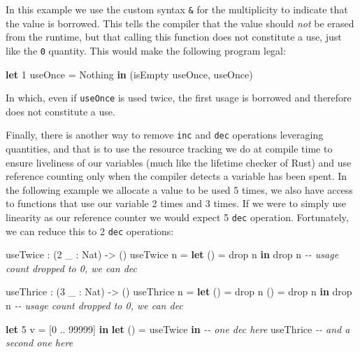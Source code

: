 \documentclass[
]{article}
\newenvironment{Shaded}{}{}
\newcommand{\CommentTok}[1]{\textcolor[rgb]{0.38,0.63,0.69}{\textit{#1}}}
\newcommand{\DataTypeTok}[1]{\textcolor[rgb]{0.56,0.13,0.00}{#1}}
\newcommand{\DecValTok}[1]{\textcolor[rgb]{0.25,0.63,0.44}{#1}}
\newcommand{\FunctionTok}[1]{\textcolor[rgb]{0.02,0.16,0.49}{#1}}
\newcommand{\KeywordTok}[1]{\textcolor[rgb]{0.00,0.44,0.13}{\textbf{#1}}}
\newcommand{\NormalTok}[1]{#1}
\newcommand{\OperatorTok}[1]{\textcolor[rgb]{0.40,0.40,0.40}{#1}}
\newcommand{\OtherTok}[1]{\textcolor[rgb]{0.00,0.44,0.13}{#1}}
\begin{document}
In this example we use the custom syntax \texttt{\&} for the
multiplicity to indicate that the value is borrowed. This tells the
compiler that the value should \emph{not} be erased from the runtime,
but that calling this function does not constitute a use, just like the
\texttt{0} quantity. This would make the following program legal:

\begin{Shaded}
\begin{Highlighting}[]
\KeywordTok{let} \DecValTok{1}\NormalTok{ useOnce }\OtherTok{=} \DataTypeTok{Nothing} \KeywordTok{in}
\NormalTok{    (isEmpty useOnce, useOnce)}
\end{Highlighting}
\end{Shaded}

In which, even if \texttt{useOnce} is used twice, the first usage is
borrowed and therefore does not constitute a use.

Finally, there is another way to remove \texttt{inc} and \texttt{dec}
operations leveraging quantities, and that is to use the resource
tracking we do at compile time to ensure liveliness of our variables
(much like the lifetime checker of Rust) and use reference counting only
when the compiler detects a variable has been spent. In the following
example we allocate a value to be used 5 times, we also have access to
functions that use our variable 2 times and 3 times. If we were to
simply use linearity as our reference counter we would expect 5
\texttt{dec} operation. Fortunately, we can reduce this to 2
\texttt{dec} operations:

\begin{Shaded}
\begin{Highlighting}[]
\NormalTok{useTwice }\OperatorTok{:}\NormalTok{ (}\DecValTok{2}\NormalTok{ \_ }\OperatorTok{:} \DataTypeTok{Nat}\NormalTok{) }\OtherTok{{-}\textgreater{}}\NormalTok{ ()}
\NormalTok{useTwice n }\OtherTok{=} \KeywordTok{let}\NormalTok{ () }\OtherTok{=} \FunctionTok{drop}\NormalTok{ n }\KeywordTok{in}
                 \FunctionTok{drop}\NormalTok{ n }\CommentTok{{-}{-} usage count dropped to 0, we can \textasciigrave{}dec\textasciigrave{}}

\NormalTok{useThrice }\OperatorTok{:}\NormalTok{ (}\DecValTok{3}\NormalTok{ \_ }\OperatorTok{:} \DataTypeTok{Nat}\NormalTok{) }\OtherTok{{-}\textgreater{}}\NormalTok{ ()}
\NormalTok{useThrice n }\OtherTok{=} \KeywordTok{let}\NormalTok{ () }\OtherTok{=} \FunctionTok{drop}\NormalTok{ n }
\NormalTok{                  () }\OtherTok{=} \FunctionTok{drop}\NormalTok{ n}
               \KeywordTok{in} \FunctionTok{drop}\NormalTok{ n }\CommentTok{{-}{-} usage count dropped to 0, we can \textasciigrave{}dec\textasciigrave{}}

\KeywordTok{let} \DecValTok{5}\NormalTok{ v }\OtherTok{=}\NormalTok{ [}\DecValTok{0} \OperatorTok{..} \DecValTok{99999}\NormalTok{] }\KeywordTok{in}
\KeywordTok{let}\NormalTok{ () }\OtherTok{=}\NormalTok{ useTwice }\KeywordTok{in} \CommentTok{{-}{-} one \textasciigrave{}dec\textasciigrave{} here}
\NormalTok{    useThrice }\CommentTok{{-}{-} and a second one here}
\end{Highlighting}
\end{Shaded}
\end{document}
